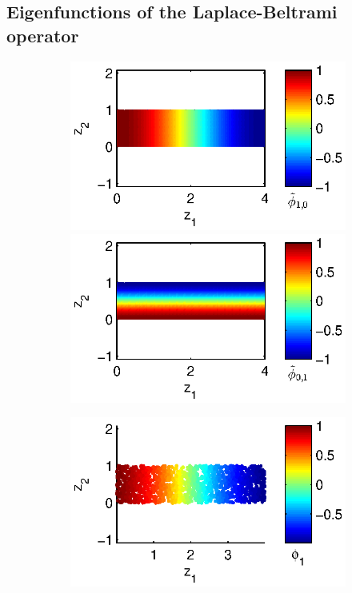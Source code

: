 \subsection{Eigenfunctions of the Laplace-Beltrami operator}

\begin{figure}[t]
\centering
\begin{subfigure}{0.3\textwidth}
\includegraphics[width=\textwidth]{strip_cnts1}
\includegraphics[width=\textwidth]{strip_cnts2}
\caption{}
\label{subfig:strip_efuncs}
\end{subfigure}
%
\begin{subfigure}{0.3\textwidth}
\includegraphics[width=\textwidth]{strip_discrete1}

\end{subfigure}
\end{figure}
